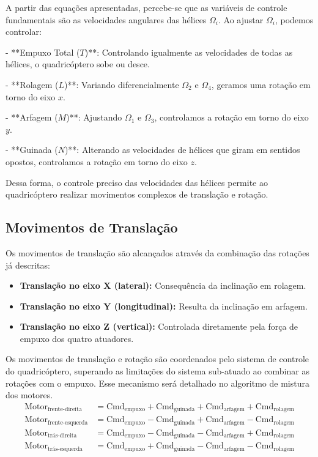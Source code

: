 A partir das equações apresentadas, percebe-se que as variáveis de controle fundamentais são as velocidades angulares das hélices \( \Omega_i \). Ao ajustar \( \Omega_i \), podemos controlar:

- **Empuxo Total (\( T \))**: Controlando igualmente as velocidades de todas as hélices, o quadricóptero sobe ou desce.

- **Rolagem (\( L \))**: Variando diferencialmente \( \Omega_2 \) e \( \Omega_4 \), geramos uma rotação em torno do eixo \( x \).

- **Arfagem (\( M \))**: Ajustando \( \Omega_1 \) e \( \Omega_3 \), controlamos a rotação em torno do eixo \( y \).

- **Guinada (\( N \))**: Alterando as velocidades de hélices que giram em sentidos opostos, controlamos a rotação em torno do eixo \( z \).

Dessa forma, o controle preciso das velocidades das hélices permite ao quadricóptero realizar movimentos complexos de translação e rotação.




\subsection{Movimentos de Translação}
Os movimentos de translação são alcançados através da combinação das rotações já descritas:

\begin{itemize}
	\item \textbf{Translação no eixo X (lateral):} Consequência da inclinação em rolagem.
	\item \textbf{Translação no eixo Y (longitudinal):} Resulta da inclinação em arfagem.
	\item \textbf{Translação no eixo Z (vertical):} Controlada diretamente pela força de empuxo dos quatro atuadores.
\end{itemize}

Os movimentos de translação e rotação são coordenados pelo sistema de controle do quadricóptero, superando as limitações do sistema sub-atuado ao combinar as rotações com o empuxo. Esse mecanismo será detalhado no algoritmo de mistura dos motores.
\begin{align}
	\text{Motor}_{\text{frente-direita}} &= \text{Cmd}_{\text{empuxo}} + \text{Cmd}_{\text{guinada}} + \text{Cmd}_{\text{arfagem}} + \text{Cmd}_{\text{rolagem}} \\
	\text{Motor}_{\text{frente-esquerda}} &= \text{Cmd}_{\text{empuxo}} - \text{Cmd}_{\text{guinada}} + \text{Cmd}_{\text{arfagem}} - \text{Cmd}_{\text{rolagem}} \\
	\text{Motor}_{\text{trás-direita}} &= \text{Cmd}_{\text{empuxo}} - \text{Cmd}_{\text{guinada}} - \text{Cmd}_{\text{arfagem}} + \text{Cmd}_{\text{rolagem}} \\
	\text{Motor}_{\text{trás-esquerda}} &= \text{Cmd}_{\text{empuxo}} + \text{Cmd}_{\text{guinada}} - \text{Cmd}_{\text{arfagem}} - \text{Cmd}_{\text{rolagem}}
\end{align}

